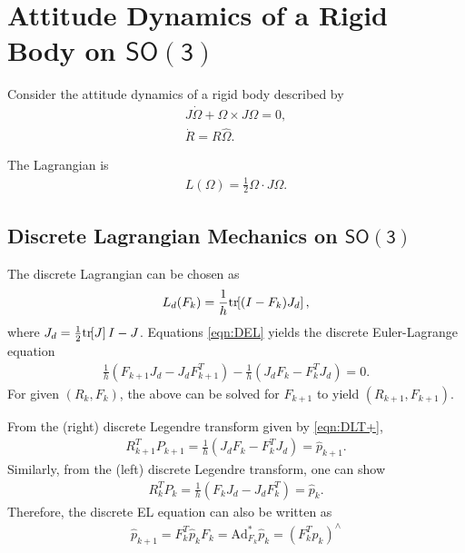 \documentclass[letterpaper, 10pt, conference]{ieeeconf}
\newcommand{\bracket}[1]{\ensuremath{\left[ #1 \right]}}
\newcommand{\tr}[1]{\mbox{tr}\ensuremath{\negthickspace\bracket{#1}}}
\newcommand{\SO}{\ensuremath{\mathsf{SO(3)}}}
\newcommand{\Ad}{\ensuremath{\mathrm{Ad}}}
\begin{document}
\section{Attitude Dynamics of a Rigid Body on $\SO$}

Consider the attitude dynamics of a rigid body described by
\begin{gather*}
    J\dot\Omega + \Omega\times J\Omega = 0, \\
    \dot R = R\hat\Omega.
\end{gather*}

The Lagrangian is
\begin{align*}
    L(\Omega) = \frac{1}{2}\Omega \cdot J\Omega.
\end{align*}

\subsection{Discrete Lagrangian Mechanics on $\SO$}

The discrete Lagrangian can be chosen as
\begin{align*}
    L_d (F_k) = \frac{1}{h} \tr{ (I-F_k) J_d},
\end{align*}
where $J_d = \frac{1}{2}\tr{J}I- J$.
Equations \eqref{eqn:DEL} yields the discrete Euler-Lagrange equation
\begin{align*}
    \frac{1}{h} ( F_{k+1}J_d - J_d F_{k+1}^T ) -\frac{1}{h} (J_d F_k - F_k^T J_d) = 0.
\end{align*}
For given $(R_k,F_k)$, the above can be solved for $F_{k+1}$ to yield $(R_{k+1}, F_{k+1})$.

From the (right) discrete Legendre transform given by \eqref{eqn:DLT+},
\begin{align}
    R_{k+1}^T P_{k+1}  = \frac{1}{h}(J_d F_k - F_k^T J_d) =\hat p_{k+1}. \label{eqn:Pkp}
\end{align}
Similarly, from the (left) discrete Legendre transform, one can show
\begin{align*}
    R_k^T P_k = \frac{1}{h} (F_k J_d - J_d F_k^T) = \hat p_k.
\end{align*}
Therefore, the discrete EL equation can also be written as
\begin{align*}
    \hat p_{k+1} = F_k^T \hat p_k F_k  = \Ad^*_{F_k} \hat p_k = (F_k^Tp_k)^\wedge
\end{align*}
\end{document}
